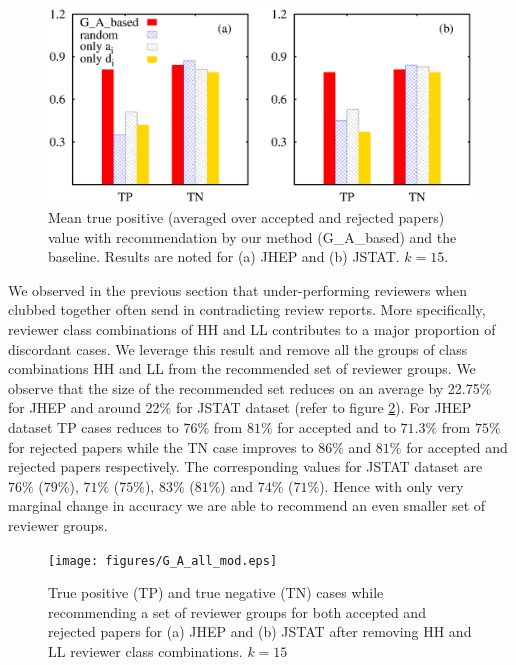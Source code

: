 \begin{figure}
\centering
\includegraphics[scale = 0.35]{./texfiles/Chapter_4/cikm_17/figures/G_A_baseline.eps}
\caption{\label{fig:GA_base} Mean true positive (averaged over accepted and rejected papers) value with recommendation by our method (G\_A\_based) and the baseline. Results are 
noted for (a) JHEP and (b) JSTAT. $k = 15$.\vspace{4mm}}
\end{figure}

 We observed in the previous section that under-performing reviewers when clubbed together often send in contradicting review reports. More specifically, 
reviewer class combinations of HH and LL contributes to a major proportion of discordant cases. We leverage this result and remove all the groups of class 
combinations HH and LL from the recommended set of reviewer groups. We observe that the size of the recommended set reduces on an average by 22.75\% for 
JHEP and around 22\% for JSTAT dataset (refer to figure \ref{fig:G_A_mod}). For JHEP dataset TP cases reduces to $76\%$ from $81\%$ for accepted and to $71.3\%$ 
from $75\%$ for rejected papers while the TN case improves to $86\%$ and $81\%$ for accepted and rejected papers respectively. The corresponding values for 
JSTAT dataset are $76\%$ ($79\%$), $71\%$ ($75\%$), $83\%$ ($81\%$) and $74\%$ ($71\%$). Hence with only very marginal change in accuracy we are able to recommend 
an even smaller set of reviewer groups. 

\begin{figure}
\texttt{[image: figures/G\_A\_all\_mod.eps]}
\caption{\label{fig:G_A_mod} True positive (TP) and true negative (TN) cases while recommending a set of reviewer groups for both accepted and rejected papers 
for (a) JHEP and (b) JSTAT after removing HH and LL reviewer class combinations. $k = 15$}
\end{figure}
\fi

\medskip
